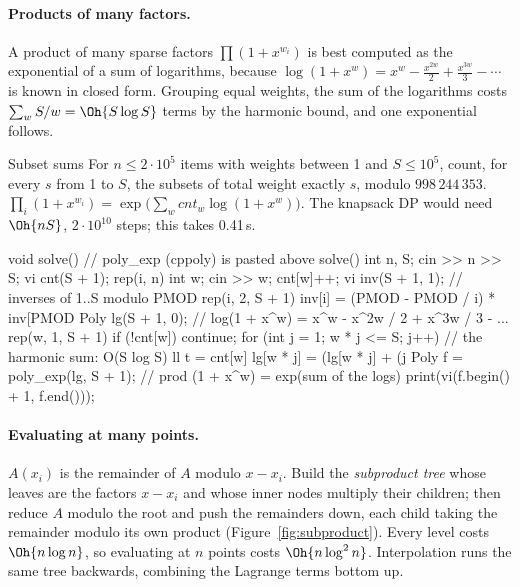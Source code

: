 \paragraph{Products of many factors.} A product of many sparse factors $\prod (1 + x^{w_i})$ is best computed as the exponential of a sum
of logarithms, because $\log(1 + x^w) = x^w - \frac{x^{2w}}{2} + \frac{x^{3w}}{3} - \cdots$ is known in closed form. Grouping equal
weights, the sum of the logarithms costs $\sum_w S / w = \Oh{S \log S}$ terms by the harmonic bound, and one exponential follows.

\begin{problem}{Subset sums}
For $n \le 2 \cdot 10^5$ items with weights between 1 and $S \le 10^5$, count, for every $s$ from 1 to $S$, the subsets of total weight
exactly $s$, modulo $998\,244\,353$.
\solution $\prod_i (1 + x^{w_i}) = \exp\bigl(\sum_w \mathit{cnt}_w \log(1 + x^w)\bigr)$. The knapsack DP would need $\Oh{nS}$, $2 \cdot
10^{10}$ steps; this takes 0.41\,s.
\end{problem}

\begin{code}
void solve() {  // poly_exp (cppoly) is pasted above solve()
    int n, S;
    cin >> n >> S;
    vi cnt(S + 1);
    rep(i, n) {
        int w;
        cin >> w;
        cnt[w]++;
    }
    vi inv(S + 1, 1);  // inverses of 1..S modulo PMOD
    rep(i, 2, S + 1) inv[i] = (PMOD - PMOD / i) * inv[PMOD %
    Poly lg(S + 1, 0);  // log(1 + x^w) = x^w - x^2w / 2 + x^3w / 3 - ...
    rep(w, 1, S + 1) {
        if (!cnt[w]) continue;
        for (int j = 1; w * j <= S; j++) {  // the harmonic sum: O(S log S)
            ll t = cnt[w] %
            lg[w * j] = (lg[w * j] + (j %
        }
    }
    Poly f = poly_exp(lg, S + 1);  // prod (1 + x^w) = exp(sum of the logs)
    print(vi(f.begin() + 1, f.end()));
}
\end{code}

\paragraph{Evaluating at many points.} $A(x_i)$ is the remainder of $A$ modulo $x - x_i$. Build the \emph{subproduct tree} whose leaves
are the factors $x - x_i$ and whose inner nodes multiply their children; then reduce $A$ modulo the root and push the remainders down,
each child taking the remainder modulo its own product (Figure~\ref{fig:subproduct}). Every level costs $\Oh{n \log n}$, so evaluating
at $n$ points costs $\Oh{n \log^2 n}$. Interpolation runs the same tree backwards, combining the Lagrange terms bottom up.

